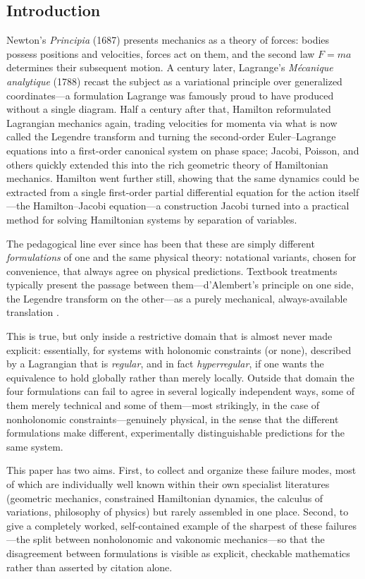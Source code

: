 \subsection{Introduction}

Newton's \emph{Principia} (1687) presents mechanics as a theory of forces:
bodies possess positions and velocities, forces act on them, and the second law
$F = ma$ determines their subsequent motion. A century later, Lagrange's
\emph{M\'ecanique analytique} (1788) recast the subject as a variational
principle over generalized coordinates---a formulation Lagrange was famously
proud to have produced without a single diagram. Half a century after that,
Hamilton reformulated Lagrangian mechanics again, trading velocities for
momenta via what is now called the Legendre transform and turning the
second-order Euler--Lagrange equations into a first-order canonical system on
phase space; Jacobi, Poisson, and others quickly extended this into the rich
geometric theory of Hamiltonian mechanics. Hamilton went further still, showing
that the same dynamics could be extracted from a single first-order partial
differential equation for the action itself---the Hamilton--Jacobi equation---a
construction Jacobi turned into a practical method for solving Hamiltonian
systems by separation of variables.

The pedagogical line ever since has been that these are simply different
\emph{formulations} of one and the same physical theory: notational variants,
chosen for convenience, that always agree on physical predictions. Textbook
treatments typically present the passage between them---d'Alembert's principle
on one side, the Legendre transform on the other---as a purely mechanical,
always-available translation \cite{goldstein2001,arnold1989}.

This is true, but only inside a restrictive domain that is almost never made
explicit: essentially, for systems with holonomic constraints (or none),
described by a Lagrangian that is \emph{regular}, and in fact
\emph{hyperregular}, if one wants the equivalence to hold globally rather than
merely locally. Outside that domain the four formulations can fail to agree in
several logically independent ways, some of them merely technical and some of
them---most strikingly, in the case of nonholonomic constraints---genuinely
physical, in the sense that the different formulations make different,
experimentally distinguishable predictions for the same system.

This paper has two aims. First, to collect and organize these failure modes,
most of which are individually well known within their own specialist
literatures (geometric mechanics, constrained Hamiltonian dynamics, the
calculus of variations, philosophy of physics) but rarely assembled in one
place. Second, to give a completely worked, self-contained example of the
sharpest of these failures---the split between nonholonomic and vakonomic
mechanics---so that the disagreement between formulations is visible as
explicit, checkable mathematics rather than asserted by citation alone.

